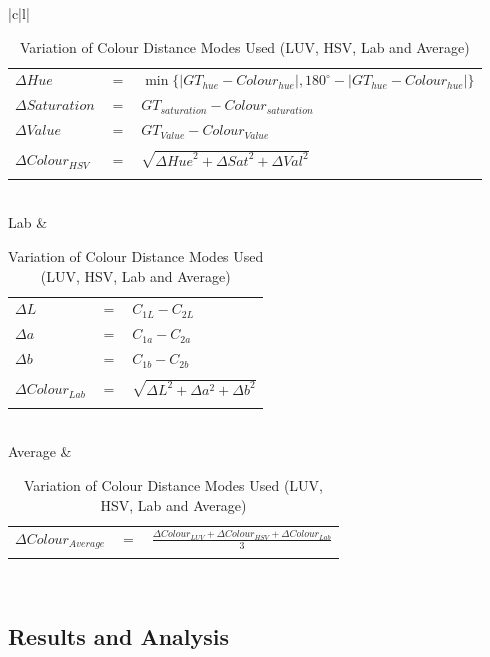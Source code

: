 \begin{table}[!ht]
\begin{tabular}{|c|l|}
\begin{tabular}{lcl}
$\Delta{Hue}$ & $=$ & $\min\{ \mid GT_{hue} - Colour_{hue} \mid,  180^{\circ} - \mid GT_{hue} - Colour_{hue} \mid  \}$ \\
$\Delta  Saturation$ & $=$ & $GT_{saturation} - Colour_{saturation}$ \\
$\Delta  Value$ &  $=$ & $GT_{Value} - Colour_{Value}$ \\
\\
$\Delta Colour_{HSV}$ & $=$ & $\sqrt{\Delta{Hue}^{2} + \Delta{Sat}^{2}  + \Delta{Val}^{2} }$
\\
\hspace{4em}& & \\
\end{tabular}\\
\hline
Lab &
\begin{tabular}{lcl}
\\
$\Delta L$ & $=$ & $C_{1L} - C_{2L}$\\
$\Delta a$ & $=$ & $C_{1a} - C_{2a}$\\
$\Delta b$ & $=$ & $C_{1b} - C_{2b}$\\
\\
$\Delta{Colour_{Lab}}$ & $=$ & $\sqrt{\Delta{L}^{2} + \Delta{a}^{2}  + \Delta{b}^{2} }$
\\
\hspace{5em}& & \\
\end{tabular}\\
\hline
Average &
\begin{tabular}{lcl}
\\
$\Delta{Colour_{Average}}$ & $=$ & $\frac{\Delta{Colour_{LUV}} + \Delta{Colour_{HSV}} + \Delta{Colour_{Lab}}}{3}$
\\
\hspace{4em}& & \\
\end{tabular}\\
\hline
\end{tabular}
  \caption{Variation of Colour Distance Modes Used (LUV, HSV, Lab and Average)}
\label{table:ColorVariation}
\end{table}


\subsection{Results and Analysis}

